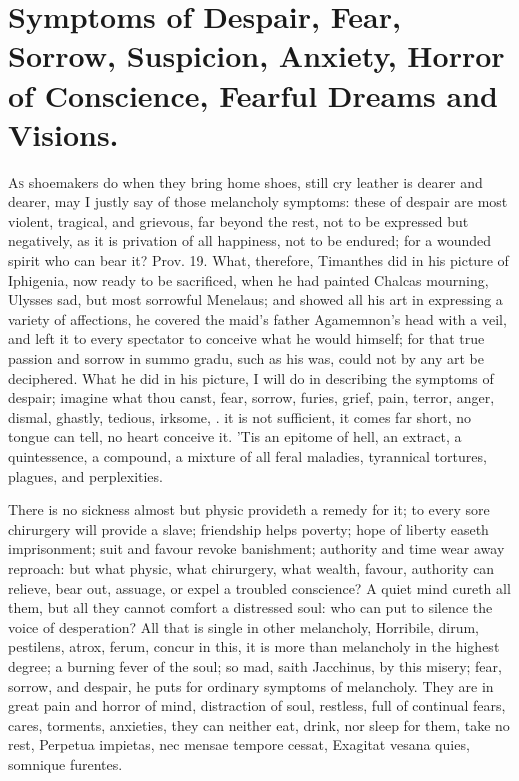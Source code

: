 {%
\section[Symptoms of Despair]{Symptoms of Despair, Fear, Sorrow, Suspicion, Anxiety, Horror of Conscience, Fearful Dreams and Visions.}

\lettrine{A}{s} shoemakers do when they bring home shoes, still cry leather is
dearer and dearer, may I justly say of those melancholy symptoms: these
of despair are most violent, tragical, and grievous, far beyond the
rest, not to be expressed but negatively, as it is privation of all
happiness, not to be endured; for a wounded spirit who can bear it?
Prov.  19. What, therefore, Timanthes did in his picture of
Iphigenia, now ready to be sacrificed, when he had painted Chalcas
mourning, Ulysses sad, but most sorrowful Menelaus; and showed all his
art in expressing a variety of affections, he covered the maid's father
Agamemnon's head with a veil, and left it to every spectator to
conceive what he would himself; for that true passion and sorrow in
summo gradu, such as his was, could not by any art be deciphered. What
he did in his picture, I will do in describing the symptoms of despair;
imagine what thou canst, fear, sorrow, furies, grief, pain, terror,
anger, dismal, ghastly, tedious, irksome, \etc{}. it is not sufficient, it
comes far short, no tongue can tell, no heart conceive it. 'Tis an
epitome of hell, an extract, a quintessence, a compound, a mixture of
all feral maladies, tyrannical tortures, plagues, and perplexities.

There is no sickness almost but physic provideth a remedy for it; to
every sore chirurgery will provide a slave; friendship helps poverty;
hope of liberty easeth imprisonment; suit and favour revoke banishment;
authority and time wear away reproach: but what physic, what
chirurgery, what wealth, favour, authority can relieve, bear out,
assuage, or expel a troubled conscience? A quiet mind cureth all them,
but all they cannot comfort a distressed soul: who can put to silence
the voice of desperation? All that is single in other melancholy,
Horribile, dirum, pestilens, atrox, ferum, concur in this, it is more
than melancholy in the highest degree; a burning fever of the soul; so
mad, saith Jacchinus, by this misery; fear, sorrow, and despair,
he puts for ordinary symptoms of melancholy. They are in great pain and
horror of mind, distraction of soul, restless, full of continual fears,
cares, torments, anxieties, they can neither eat, drink, nor sleep for
them, take no rest,
Perpetua impietas, nec mensae tempore cessat,
Exagitat vesana quies, somnique furentes.

}
